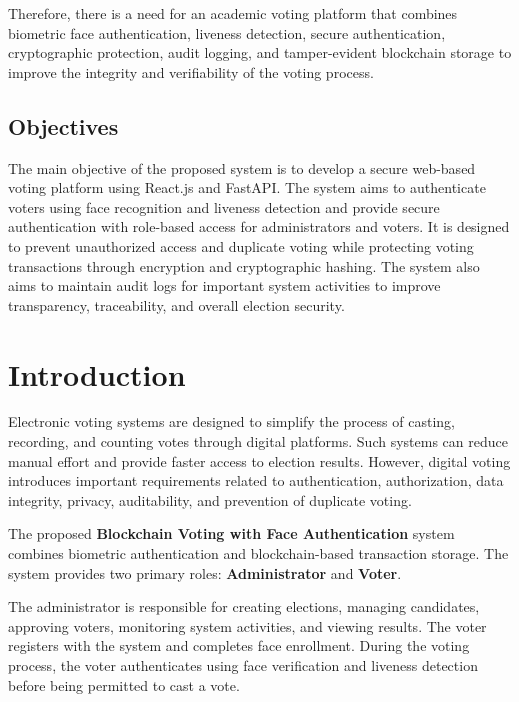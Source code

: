 \documentclass[12pt,a4paper]{report}
\begin{document}
Therefore, there is a need for an academic voting platform that combines biometric face authentication, liveness detection, secure authentication, cryptographic protection, audit logging, and tamper-evident blockchain storage to improve the integrity and verifiability of the voting process.


\section*{Objectives}

The main objective of the proposed system is to develop a secure web-based voting platform using React.js and FastAPI. The system aims to authenticate voters using face recognition and liveness detection and provide secure authentication with role-based access for administrators and voters. It is designed to prevent unauthorized access and duplicate voting while protecting voting transactions through encryption and cryptographic hashing. The system also aims to maintain audit logs for important system activities to improve transparency, traceability, and overall election security.


\chapter*{Introduction}

Electronic voting systems are designed to simplify the process of casting, recording, and counting votes through digital platforms. Such systems can reduce manual effort and provide faster access to election results. However, digital voting introduces important requirements related to authentication, authorization, data integrity, privacy, auditability, and prevention of duplicate voting.

The proposed \textbf{Blockchain Voting with Face Authentication} system combines biometric authentication and blockchain-based transaction storage. The system provides two primary roles: \textbf{Administrator} and \textbf{Voter}.

The administrator is responsible for creating elections, managing candidates, approving voters, monitoring system activities, and viewing results. The voter registers with the system and completes face enrollment. During the voting process, the voter authenticates using face verification and liveness detection before being permitted to cast a vote.
\end{document}
